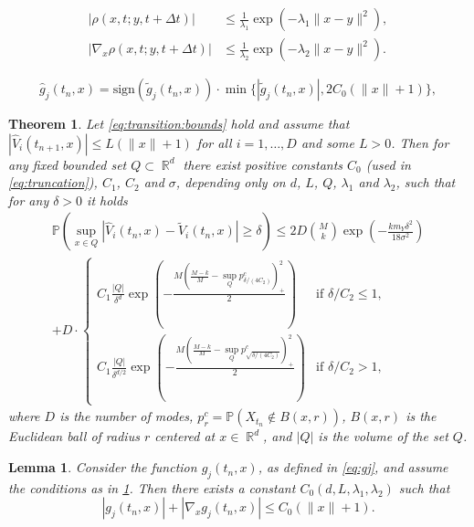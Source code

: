 \documentclass[10pt,a4paper]{amsart}
\newtheorem{theorem}{Theorem}
\newtheorem{lemma}{Lemma}
\renewcommand{\P}{\mathbb{P}}
\DeclareMathOperator{\R}{\mathbb{R}}
\begin{document}
\begin{equation} \label{eq:transition:bounds}
  \begin{split}
    |\rho(x,t;y,t+\Delta t)|          & \leq \frac{1}{\lambda_1} \exp(-\lambda_1 \|x-y\|^2),
    \\
    |\nabla_x \rho(x,t;y,t+\Delta t)| & \leq \frac{1}{\lambda_2} \exp(-\lambda_2 \|x-y\|^2).
  \end{split}
\end{equation}

\begin{equation} \label{eq:truncation}
  \widehat{g}_j(t_n,x) = \mathrm{sign}(\widetilde{g}_j(t_n,x)) \cdot \min\{|\widetilde{g}_j(t_n,x)|, 2 C_0(\|x\|+1)\},
\end{equation}

\begin{theorem} \label{thm:1}
  Let \cref{eq:transition:bounds} hold and assume that $|\widehat{V}_i(t_{n+1},x)| \leq L (\|x\|+1)$ for all $i = 1,\dots,D$ and some $L > 0$.
  Then for any fixed bounded set $Q \subset \R^d$ there exist positive constants
  $C_0$ (used in \cref{eq:truncation}), $C_1$, $C_2$ and $\sigma$, depending only on $d$, $L$, $Q$, $\lambda_1$ and $\lambda_2$, such that for any $\delta > 0$ it holds
  \begin{multline*}
    \P(\sup_{x \in Q} |\widehat{V}_i(t_n,x) - \widetilde{V}_i(t_n,x)| \geq \delta) \leq
    2D{\binom{M}{k}} \exp \left (-\frac{k m_Y\delta^2}{18 \sigma^2} \right )
    \\
    + D \cdot
    \begin{cases}
      C_1 \frac{|Q|}{\delta^d} \exp \left (-\frac{M \left (\frac{M-k}{M} - \sup_Q p_{\delta/(4 C_2)}^c \right )_+^2}{2} \right )            & \text{if } \delta/C_2 \leq 1,
      \\
      C_1 \frac{|Q|}{\delta^{d/2}} \exp \left (-\frac{M \left (\frac{M-k}{M} - \sup_Q p_{\sqrt{\delta/(4 C_2)}}^c \right )_+^2}{2} \right ) & \text{if } \delta/C_2 > 1,
    \end{cases}
  \end{multline*}
  where $D$ is the number of modes, $p_{r}^c = \P(X_{t_n} \not \in B(x,r))$, $B(x,r)$ is the Euclidean ball of radius $r$ centered at $x \in \R^d$, and $|Q|$ is the volume of the set $Q$.
\end{theorem}

\begin{lemma} \label{lemma:gj:lipschitz}
  Consider the function $g_j(t_{n},x)$, as defined in \cref{eq:gj}, and assume the conditions as in \cref{thm:1}.
  Then there exists a constant $C_0(d,L,\lambda_1,\lambda_2)$ such that
  \begin{equation*}
    |g_j(t_{n},x)| + |\nabla_x g_j(t_{n},x)| \leq C_0(\|x\|+1).
  \end{equation*}
\end{lemma}
\end{document}
